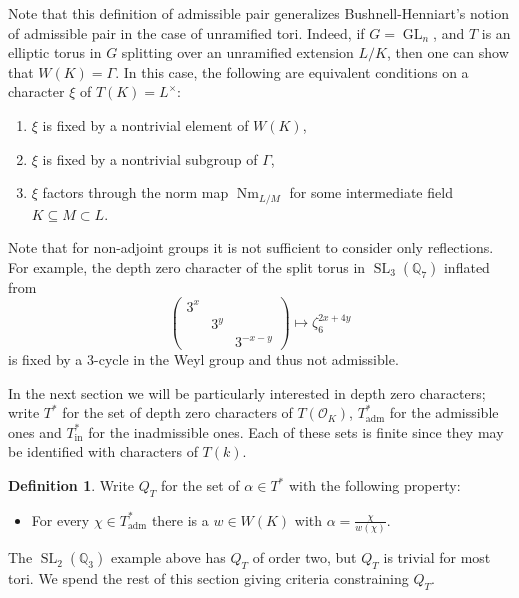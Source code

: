 \documentclass{compositio}
\theoremstyle{plain}
\theoremstyle{definition}
\newtheorem{definition}[theorem]{Definition}
\numberwithin{equation}{section}
\DeclareMathOperator{\Nm}{Nm}
\DeclareMathOperator{\GL}{GL}
\DeclareMathOperator{\SL}{SL}
\newcommand{\OK}{\mathcal{O}_K}
\newcommand{\QQ}{\mathbb{Q}}
\newcommand{\Lx}{L^\times}
\newcommand{\Thadm}{T^*_{\operatorname{adm}}}
\newcommand{\Thinadm}{T^*_{\operatorname{in}}}
\newcommand{\hatT}{T^*}
\begin{document}
Note that this definition of admissible pair generalizes
Bushnell-Henniart's notion of admissible pair \cite{bushnell-henniart:10a} in
the case of unramified tori.  Indeed,
if $G = \GL_n$, and $T$ is an elliptic torus in $G$ splitting over
an unramified extension $L/K$, then one can show that
$W(K) = \Gamma$.  In this case, the following are equivalent conditions
on a character $\xi$ of $T(K) = \Lx$:
\begin{enumerate}
\item $\xi$ is fixed by a nontrivial element of $W(K)$,
\item $\xi$ is fixed by a nontrivial subgroup of $\Gamma$,
\item $\xi$ factors through the norm map $\Nm_{L/M}$ for some intermediate field $K \subseteq M \subset L$.
\end{enumerate}

Note that for non-adjoint groups it is not sufficient to consider only reflections.
For example, the depth zero character of the split torus in $\SL_3(\QQ_7)$ inflated from
$$\begin{pmatrix} 3^x & & \\ & 3^y & \\ & & 3^{-x-y} \end{pmatrix} \mapsto \zeta_6^{2x + 4y}$$
is fixed by a 3-cycle in the Weyl group and thus not admissible.

In the next section we will be particularly interested in depth zero characters; write $\hatT$ for the set of
depth zero characters of $T(\OK)$, $\Thadm$ for the admissible
ones and $\Thinadm$ for the inadmissible ones.  Each of these
sets is finite since they may be identified with characters of $T(k)$.

\begin{definition}
Write $Q_T$ for the set of $\alpha \in \hatT$ with the following property:
\begin{itemize}
\item For every $\chi \in \Thadm$ there is a $w \in W(K)$ with $\alpha = \frac{\chi}{w(\chi)}$.
\end{itemize}
\end{definition}

The $\SL_2(\QQ_3)$ example above has $Q_T$ of order two, but $Q_T$ is trivial for most tori.
We spend the rest of this section giving criteria constraining $Q_T$.
\end{document}

